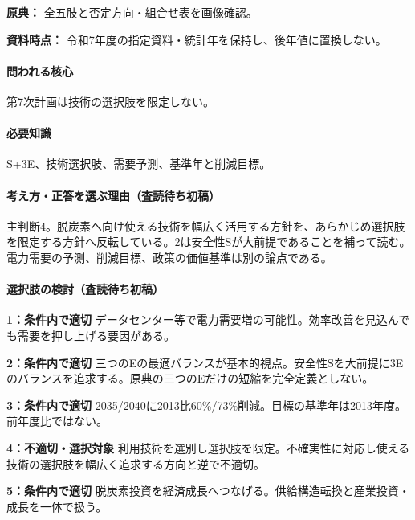 \noindent\textbf{原典：} 全五肢と否定方向・組合せ表を画像確認。\par

\noindent\textbf{資料時点：} 令和7年度の指定資料・統計年を保持し、後年値に置換しない。\par

\paragraph{問われる核心} 第7次計画は技術の選択肢を限定しない。

\paragraph{必要知識} S+3E、技術選択肢、需要予測、基準年と削減目標。

\paragraph{考え方・正答を選ぶ理由（査読待ち初稿）} 主判断4。脱炭素へ向け使える技術を幅広く活用する方針を、あらかじめ選択肢を限定する方針へ反転している。2は安全性Sが大前提であることを補って読む。電力需要の予測、削減目標、政策の価値基準は別の論点である。

\paragraph{選択肢の検討（査読待ち初稿）}\mbox{}\par

\noindent\textbf{1：条件内で適切} データセンター等で電力需要増の可能性。効率改善を見込んでも需要を押し上げる要因がある。\par

\noindent\textbf{2：条件内で適切} 三つのEの最適バランスが基本的視点。安全性Sを大前提に3Eのバランスを追求する。原典の三つのEだけの短縮を完全定義としない。\par

\noindent\textbf{3：条件内で適切} 2035/2040に2013比60\%/73\%削減。目標の基準年は2013年度。前年度比ではない。\par

\noindent\textbf{4：不適切・選択対象} 利用技術を選別し選択肢を限定。不確実性に対応し使える技術の選択肢を幅広く追求する方向と逆で不適切。\par

\noindent\textbf{5：条件内で適切} 脱炭素投資を経済成長へつなげる。供給構造転換と産業投資・成長を一体で扱う。\par

